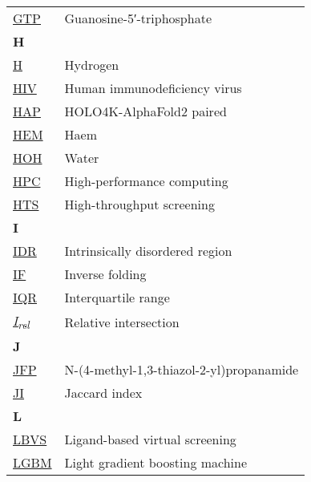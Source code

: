 \begin{longtable}[l]{@{}p{2.5cm}p{12cm}@{}}
\textmd{\href{https://www.ebi.ac.uk/pdbe-srv/pdbechem/chemicalCompound/show/GTP}{GTP}} & Guanosine-5′-triphosphate \\[0.3175cm]
\textbf{\large H} & \\[0.25cm]
\textmd{\href{https://en.wikipedia.org/wiki/Hydrogen}{H}} & Hydrogen \\
\textmd{\href{https://en.wikipedia.org/wiki/HIV}{HIV}} & Human immunodeficiency virus \\
\textmd{\href{https://jcheminf.biomedcentral.com/articles/10.1186/s13321-024-00821-4}{HAP}} & HOLO4K-AlphaFold2 paired \\
\textmd{\href{https://www.ebi.ac.uk/pdbe-srv/pdbechem/chemicalCompound/show/HEM}{HEM}} & Haem \\
\textmd{\href{https://www.ebi.ac.uk/pdbe-srv/pdbechem/chemicalCompound/show/HOH}{HOH}} & Water \\
\textmd{\href{https://en.wikipedia.org/wiki/High-performance_computing}{HPC}} & High-performance computing \\
\textmd{\href{https://en.wikipedia.org/wiki/High-throughput_screening}{HTS}} & High-throughput screening \\[0.3175cm]
\textbf{\large I} & \\[0.25cm]
\textmd{\href{https://en.wikipedia.org/wiki/Intrinsically_disordered_proteins}{IDR}} & Intrinsically disordered region \\
\textmd{\href{https://www.biorxiv.org/content/10.1101/2022.04.10.487779v2}{IF}} & Inverse folding \\
\textmd{\href{https://en.wikipedia.org/wiki/Interquartile_range}{IQR}} & Interquartile range \\
\textmd{\href{https://www.nature.com/articles/s42003-024-05970-8}{\textit{I\textsubscript{rel}}}} & Relative intersection \\[0.3175cm]
\textbf{\large J} & \\[0.25cm]
\textmd{\href{https://www.ebi.ac.uk/pdbe-srv/pdbechem/chemicalCompound/show/JFP}{JFP}} & N-(4-methyl-1,3-thiazol-2-yl)propanamide \\
\textmd{\href{https://en.wikipedia.org/wiki/Jaccard_index}{JI}} & Jaccard index \\[0.3175cm]
\textbf{\large L} & \\[0.25cm]
\textmd{\href{https://en.wikipedia.org/wiki/Virtual_screening\#Ligand-based_methods_2}{LBVS}} & Ligand-based virtual screening \\
\textmd{\href{https://en.wikipedia.org/wiki/LightGBM}{LGBM}} & Light gradient boosting machine \\

\end{longtable}
